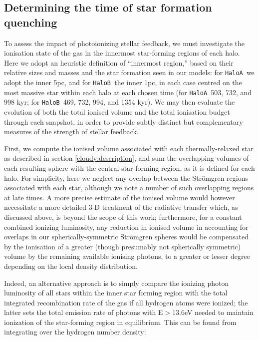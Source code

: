 \documentclass[graphics, twocolumn, usenatbib]{mn2e}
\newcommand{\ha} {\texttt{HaloA~}}
\newcommand{\hb} {\texttt{HaloB~}}
\begin{document}
\subsection{Determining the time of star formation quenching}\label{cloudy:results}

To assess the impact of photoionizing stellar feedback, we must investigate the ionisation state of the gas in the innermost star-forming regions of each halo. Here we adopt an heuristic definition of ``innermost region,'' based on their relative sizes and masses and the star formation seen in our models: for \ha we adopt the inner 5pc, and for \hb the inner 1pc, in each case centred on the most massive star within each halo at each chosen time (for \ha 503, 732, and 998 kyr; for \hb 469, 732, 994, and 1354 kyr). We may then evaluate the evolution of both the total ionised volume and the total ionisation budget through each snapshot, in order to provide subtly distinct but complementary measures of the strength of stellar feedback.

First, we compute the ionised volume associated with each thermally-relaxed star as described in section \ref{cloudy:description}, and sum the overlapping volumes of each resulting sphere with the central star-forming region, as it is defined for each halo. For simplicity, here we neglect any overlap between the Str{\" o}mgren regions associated with each star, although we note a number of such overlapping regions at late times. A more precise estimate of the ionised volume would however necessitate a more detailed 3-D treatment of the radiative transfer which, as discussed above, is beyond the scope of this work; furthermore, for a constant combined ionizing luminosity, any reduction in ionised volume in accounting for overlaps in our spherically-symmetric Str{\"o}mgren spheres would be compensated by the ionisation of a greater (though presumably not spherically symmetric) volume by the remaining available ionising photons, to a greater or lesser degree depending on the local density distribution.

Indeed, an alternative approach is to simply compare the ionizing photon luminosity of all stars within the inner star forming region with the total integrated recombination rate of the gas if all hydrogen atoms were ionized; the latter sets the total emission rate of photons with E$>$13.6eV needed to maintain ionization of the star-forming region in equilibrium. This can be found from integrating over the hydrogen number density:
\end{document}
